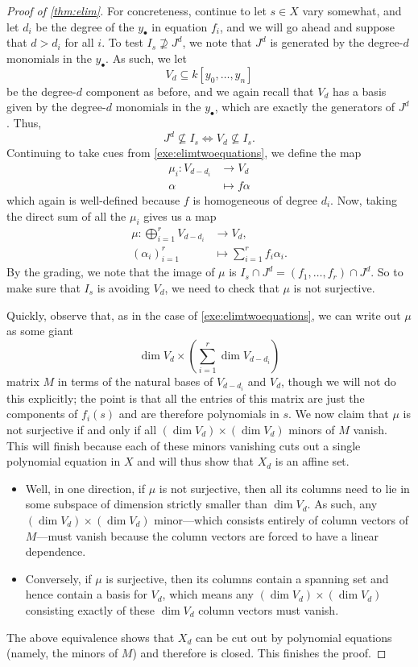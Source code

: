 \begin{proof}[Proof of \autoref{thm:elim}]
	For concreteness, continue to let $s\in X$ vary somewhat, and let $d_i$ be the degree of the $y_\bullet$ in equation $f_i$, and we will go ahead and suppose that $d>d_i$ for all $i$. To test $I_s\not\supseteq J^d$, we note that $J^d$ is generated by the degree-$d$ monomials in the $y_\bullet$. As such, we let
	\[V_d\subseteq k[y_0,\ldots,y_n]\]
	be the degree-$d$ component as before, and we again recall that $V_d$ has a basis given by the degree-$d$ monomials in the $y_\bullet$, which are exactly the generators of $J^d$. Thus,
	\[J^d\not\subseteq I_s\iff V_d\not\subseteq I_s.\]
	Continuing to take cues from \autoref{exe:elimtwoequations}, we define the map
	\begin{align*}
		\mu_i\colon V_{d-d_i} &\to V_d \\
		\alpha &\mapsto f\alpha
	\end{align*}
	which again is well-defined because $f$ is homogeneous of degree $d_i$. Now, taking the direct sum of all the $\mu_i$ gives us a map
	\begin{align*}
		\mu\colon\bigoplus_{i=1}^rV_{d-d_i} &\to V_d, \\
		(\alpha_i)_{i=1}^r &\mapsto \sum_{i=1}^rf_i\alpha_i.
	\end{align*}
	By the grading, we note that the image of $\mu$ is $I_s\cap J^d=(f_1,\ldots,f_r)\cap J^d$. So to make sure that $I_s$ is avoiding $V_d$, we need to check that $\mu$ is not surjective.
	
	Quickly, observe that, as in the case of \autoref{exe:elimtwoequations}, we can write out $\mu$ as some giant
	\[\dim V_d\times\left(\sum_{i=1}^r\dim V_{d-d_i}\right)\]
	matrix $M$ in terms of the natural bases of $V_{d-d_i}$ and $V_d$, though we will not do this explicitly; the point is that all the entries of this matrix are just the components of $f_i(s)$ and are therefore polynomials in $s$. We now claim that $\mu$ is not surjective if and only if all $(\dim V_d)\times(\dim V_d)$ minors of $M$ vanish. This will finish because each of these minors vanishing cuts out a single polynomial equation in $X$ and will thus show that $X_d$ is an affine set.
	\begin{itemize}
		\item Well, in one direction, if $\mu$ is not surjective, then all its columns need to lie in some subspace of dimension strictly smaller than $\dim V_d$. As such, any $(\dim V_d)\times(\dim V_d)$ minor---which consists entirely of column vectors of $M$---must vanish because the column vectors are forced to have a linear dependence.
		\item Conversely, if $\mu$ is surjective, then its columns contain a spanning set and hence contain a basis for $V_d$, which means any $(\dim V_d)\times(\dim V_d)$ consisting exactly of these $\dim V_d$ column vectors must vanish.
	\end{itemize}
	The above equivalence shows that $X_d$ can be cut out by polynomial equations (namely, the minors of $M$) and therefore is closed. This finishes the proof.
\end{proof}
